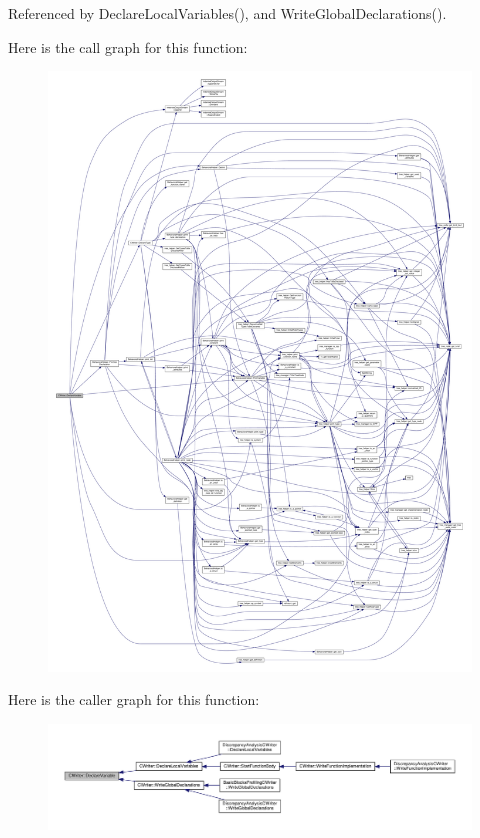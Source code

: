Referenced by Declare\+Local\+Variables(), and Write\+Global\+Declarations().

Here is the call graph for this function\+:
\nopagebreak
\begin{figure}[H]
\begin{center}
\leavevmode
\includegraphics[width=350pt]{d3/d59/classCWriter_a93167492cece9b71202aa311930b355d_cgraph}
\end{center}
\end{figure}
Here is the caller graph for this function\+:
\nopagebreak
\begin{figure}[H]
\begin{center}
\leavevmode
\includegraphics[width=350pt]{d3/d59/classCWriter_a93167492cece9b71202aa311930b355d_icgraph}
\end{center}
\end{figure}
\mbox{\label{classCWriter_aac63c089d71f0541d08bf3790a829645}} 
